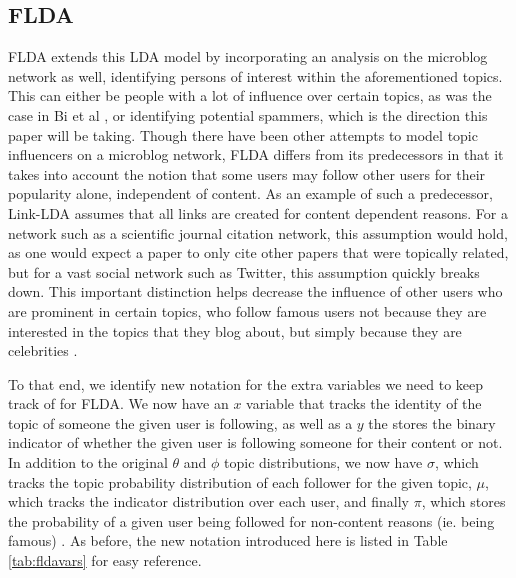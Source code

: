\documentclass[a4paper]{article}
\begin{document}
\subsection{FLDA}\label{sec:flda_bg}
FLDA extends this LDA model by incorporating an analysis on the microblog network as well, identifying persons of interest within the aforementioned topics. This can either be people with a lot of influence over certain topics, as was the case in Bi et al \cite{flda}, or identifying potential spammers, which is the direction this paper will be taking. Though there have been other attempts to model topic influencers on a microblog network, FLDA differs from its predecessors in that it takes into account the notion that some users may follow other users for their popularity alone, independent of content. As an example of such a predecessor, Link-LDA assumes that all links are created for content dependent reasons. For a network such as a scientific journal citation network, this assumption would hold, as one would expect a paper to only cite other papers that were topically related, but for a vast social network such as Twitter, this assumption quickly breaks down. This important distinction helps decrease the influence of other users who are prominent in certain topics, who follow famous users not because they are interested in the topics that they blog about, but simply because they are celebrities \cite{flda}. 

To that end, we identify new notation for the extra variables we need to keep track of for FLDA. We now have an $x$ variable that tracks the identity of the topic of someone the given user is following, as well as a $y$ the stores the binary indicator of whether the given user is following someone for their content or not. In addition to the original $\theta$ and $\phi$ topic distributions, we now have $\sigma$, which tracks the topic probability distribution of each follower for the given topic, $\mu$, which tracks the indicator distribution over each user, and finally $\pi$, which stores the probability of a given user being followed for non-content reasons (ie. being famous) \cite{flda}. As before, the new notation introduced here is listed in Table \ref{tab:fldavars} for easy reference.
\end{document}
